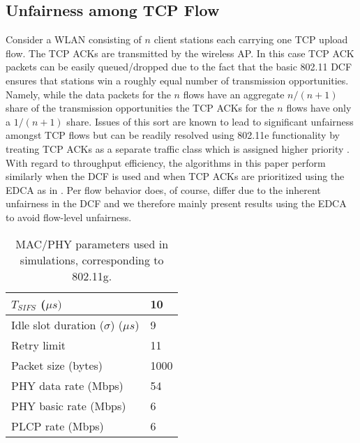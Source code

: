 \documentclass[10pt,twocolumn, journal]{IEEEtran}
\begin{document}
\subsection{Unfairness among TCP Flow}\label{subsec_tcp_unfairness}
Consider a WLAN consisting of $n$ client stations each carrying one TCP upload flow.  The TCP ACKs are transmitted by the wireless AP.  In this case TCP ACK packets can be easily queued/dropped due to the fact that the basic 802.11 DCF ensures that stations win a roughly equal number of transmission opportunities.   Namely, while the data packets for the $n$ flows have an aggregate $n/(n+1)$ share of the transmission opportunities the TCP ACKs for the $n$ flows have only a $1/(n+1)$ share.   Issues of this sort are known to lead to significant unfairness amongst TCP flows but can be readily resolved using 802.11e functionality by treating TCP ACKs as a separate traffic class which is assigned higher priority \cite{Leith_CommLetter_2005}.   With regard to throughput efficiency, the algorithms in this paper perform similarly when the DCF is used and when TCP ACKs are prioritized using the EDCA as in \cite{Leith_CommLetter_2005}.   Per flow behavior does, of course, differ due to the inherent unfairness in the DCF and we therefore mainly present results using the EDCA to avoid flow-level unfairness.


\begin{table}[tb]
\centering
                    \begin{tabular}[b]{|l|l|}\hline
                        $T_{SIFS}$ ($\mu s) $  & 10  \\
                        \hline
                        Idle slot duration ($\sigma$) ($\mu s$) & 9  \\
                        \hline
                        Retry limit  & 11 \\
                        \hline
                        Packet size (bytes)    & 1000 \\
                        \hline
                        PHY data rate (Mbps)   & 54 \\
                        \hline
                        PHY basic rate (Mbps)  & 6 \\
                        \hline
                        PLCP rate (Mbps)  & 6 \\
                        \hline
                    \end{tabular}
                \caption{MAC/PHY parameters used in simulations, corresponding to 802.11g.}
                \label{parameters_buffersizing}
\end{table}
\end{document}
